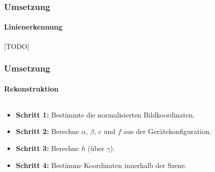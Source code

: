 \documentclass[xcolor=dvipsnames]{beamer}
\begin{document}
\begin{frame}
	\frametitle{Umsetzung}
	\framesubtitle{Linienerkennung}

	[TODO]

\end{frame}


\begin{frame}
	\frametitle{Umsetzung}
	\framesubtitle{Rekonstruktion}

	\begin{columns}
		\small
		\begin{column}{.65\linewidth}
			\begin{itemize}
				\item \textbf{Schritt 1:} Bestimmte die normalisierten Bildkoordinaten.
				\item \textbf{Schritt 2:} Berechne $\alpha$, $\beta$, $c$ und $f$ aus der Gerätekonfiguration.
				\item \textbf{Schritt 3:} Berechne $h$ (über $\gamma$).
				\item \textbf{Schritt 4:} Bestimme Koordinaten innerhalb der Szene.
			\end{itemize}
		\end{column}
		\begin{column}{.35\linewidth}
			\hfill{}

\end{column}
\end{columns}
\end{frame}
\end{document}
